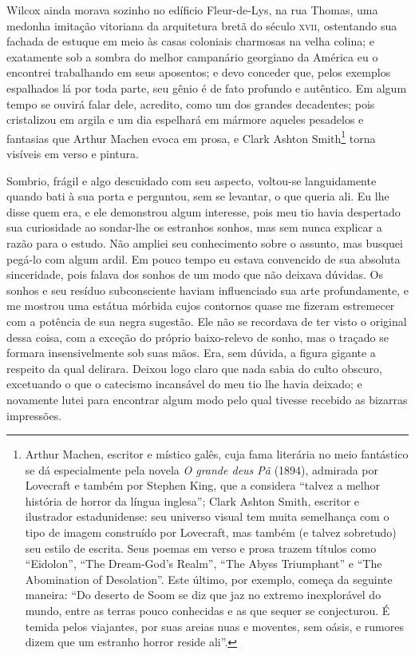 Wilcox ainda morava sozinho no edíficio Fleur-de-Lys, na rua Thomas,
uma medonha imitação vitoriana da arquitetura bretã do século \textsc{xvii},
ostentando sua fachada de estuque em meio às casas coloniais charmosas
na velha colina; e exatamente sob a sombra do melhor campanário
georgiano da América eu o encontrei trabalhando em seus aposentos; e
devo conceder que, pelos exemplos espalhados lá por toda parte, seu
gênio é de fato profundo e autêntico. Em algum tempo se ouvirá falar
dele, acredito, como um dos grandes decadentes; pois cristalizou em
argila e um dia espelhará em mármore aqueles pesadelos e fantasias que
Arthur Machen evoca em prosa, e Clark Ashton Smith\footnote{Arthur
  Machen, escritor e místico galês, cuja fama literária no
  meio fantástico se dá especialmente pela novela \emph{O grande deus Pã} (1894), 
  admirada por Lovecraft e também por Stephen King, que a
  considera ``talvez a melhor história de horror da língua inglesa'';
  Clark Ashton Smith, escritor e ilustrador estadunidense:
  seu universo visual tem muita semelhança com o tipo de imagem
  construído por Lovecraft, mas também (e talvez sobretudo) seu estilo
  de escrita. Seus poemas em verso e prosa trazem títulos como
  ``Eidolon'', ``The Dream-God's Realm'', ``The Abyss Triumphant'' e
  ``The Abomination of Desolation''. Este último, por exemplo, começa da
  seguinte maneira: ``Do deserto de Soom se diz que jaz no extremo
  inexplorável do mundo, entre as terras pouco conhecidas e as que
  sequer se conjecturou. É temida pelos viajantes, por suas areias nuas
  e moventes, sem oásis, e rumores dizem que um estranho horror reside
  ali''.} torna visíveis em verso e pintura.

Sombrio, frágil e algo descuidado com seu aspecto, voltou-se
languidamente quando bati à sua porta e perguntou, sem se levantar, o
que queria ali. Eu lhe disse quem era, e ele demonstrou algum interesse,
pois meu tio havia despertado sua curiosidade ao sondar-lhe os estranhos
sonhos, mas sem nunca explicar a razão para o estudo. Não ampliei seu
conhecimento sobre o assunto, mas busquei pegá-lo com algum ardil. Em
pouco tempo eu estava convencido de sua absoluta sinceridade, pois
falava dos sonhos de um modo que não deixava dúvidas. Os sonhos e seu resíduo
subconsciente haviam influenciado sua arte profundamente, e me mostrou
uma estátua mórbida cujos contornos quase me fizeram estremecer com a
potência de sua negra sugestão. Ele não se recordava de ter visto o
original dessa coisa, com a exceção do próprio baixo-relevo de
sonho, mas o traçado se formara insensivelmente sob suas mãos. Era,
sem dúvida, a figura gigante a respeito da qual delirara. Deixou logo
claro que nada sabia do culto obscuro, excetuando o que o catecismo
incansável do meu tio lhe havia deixado; e novamente lutei para
encontrar algum modo pelo qual tivesse recebido as bizarras impressões.


